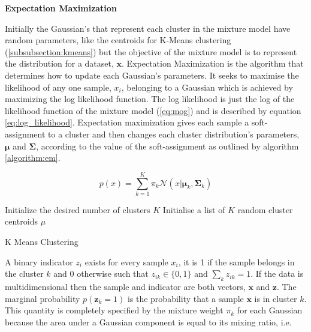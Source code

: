 \textbf{Expectation Maximization}

Initially the Gaussian's that represent each cluster in the mixture model have random parameters, like the centroids for K-Means clustering (\ref{subsubsection:kmeans}) but the objective of the mixture model is to represent the distribution for a dataset, $\bm{x}$. Expectation Maximization \cite{dempster_EM}\cite{emalgo} is the algorithm that determines how to update each Gaussian's parameters. It seeks to maximise the likelihood of any one sample, $x_i$, belonging to a Gaussian which is achieved by maximizing the log likelihood function. The log likelihood is just the log of the likelihood function of the mixture model (\ref{eq:mog}) and is described by equation \ref{eq:log_likelihood}. Expectation maximization gives each sample a soft-assignment to a cluster and then changes each cluster distribution's parameters, $\bm{\mu}$ and $\bm{\Sigma}$, according to the value of the soft-assignment as outlined by algorithm \ref{algorithm:em}.

\begin{equation}
\label{eq:log_likelihood}
p(x) = \sum^K_{k=1} \pi_k \mathcal{N}(x|\bm{\mu}_k, \bm{\Sigma}_k)
\end{equation}


\begin{algorithm}
    \SetAlgoLined
    Initialize the desired number of clusters $K$\;
    Initialise a list of $K$ random cluster centroids $\mu$\;
    \caption{K Means Clustering \cite{oreilly_python}}
    \label{algorithm:em}
\end{algorithm}















A binary indicator $z_{i}$ exists for every sample $x_i$, it is 1 if the sample belongs in the cluster $k$ and 0 otherwise such that $z_{ik} \in \{0, 1\}$ and $\sum_k z_{ik} = 1$. If the data is multidimensional then the sample and indicator are both vectors, $\bm{x}$ and $\bm{z}$. The marginal probability $p(\bm{z}_{k} = 1)$ is the probability that a sample $\bm{x}$ is in cluster $k$. This quantity is completely specified by the mixture weight $\pi_k$ for each Gaussian because the area under a Gaussian component is equal to its mixing ratio, i.e.

